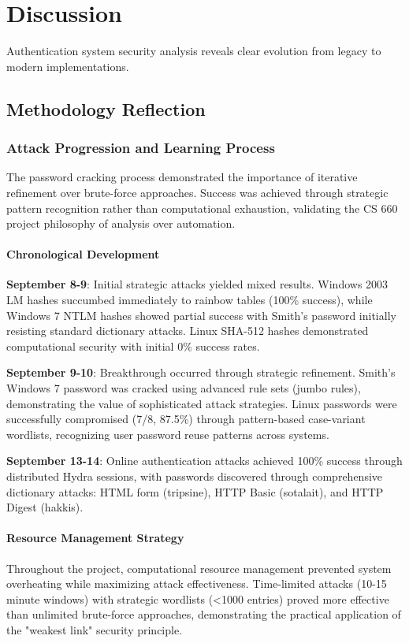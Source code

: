 \section{Discussion}

Authentication system security analysis reveals clear evolution from legacy to modern implementations.

\subsection{Methodology Reflection}

\subsubsection{Attack Progression and Learning Process}

The password cracking process demonstrated the importance of iterative refinement over brute-force approaches. Success was achieved through strategic pattern recognition rather than computational exhaustion, validating the CS 660 project philosophy of analysis over automation.

\paragraph{Chronological Development}
\textbf{September 8-9}: Initial strategic attacks yielded mixed results. Windows 2003 LM hashes succumbed immediately to rainbow tables (100\% success), while Windows 7 NTLM hashes showed partial success with Smith's password initially resisting standard dictionary attacks. Linux SHA-512 hashes demonstrated computational security with initial 0\% success rates.

\textbf{September 9-10}: Breakthrough occurred through strategic refinement. Smith's Windows 7 password was cracked using advanced rule sets (jumbo rules), demonstrating the value of sophisticated attack strategies. Linux passwords were successfully compromised (7/8, 87.5\%) through pattern-based case-variant wordlists, recognizing user password reuse patterns across systems.

\textbf{September 13-14}: Online authentication attacks achieved 100\% success through distributed Hydra sessions, with passwords discovered through comprehensive dictionary attacks: HTML form (tripsine), HTTP Basic (sotalait), and HTTP Digest (hakkis).

\paragraph{Resource Management Strategy}
Throughout the project, computational resource management prevented system overheating while maximizing attack effectiveness. Time-limited attacks (10-15 minute windows) with strategic wordlists (<1000 entries) proved more effective than unlimited brute-force approaches, demonstrating the practical application of the "weakest link" security principle.

